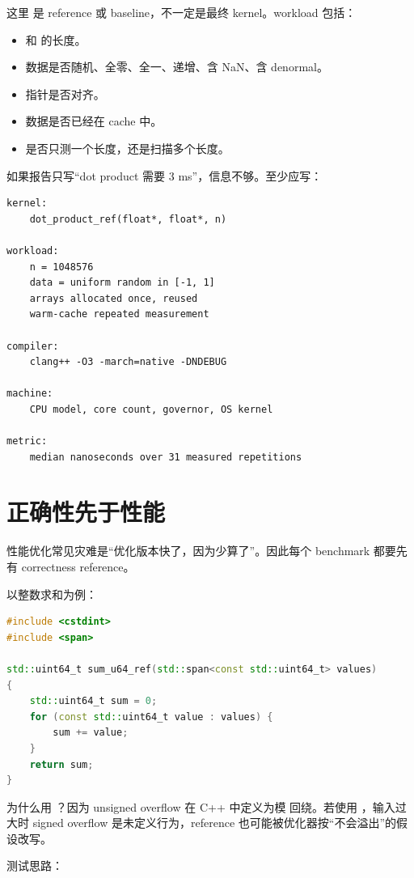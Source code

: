 这里  是 reference 或 baseline，不一定是最终 kernel。workload 包括：

\begin{itemize}
  \item {} 和  的长度。
  \item 数据是否随机、全零、全一、递增、含 NaN、含 denormal。
  \item 指针是否对齐。
  \item 数据是否已经在 cache 中。
  \item 是否只测一个长度，还是扫描多个长度。
\end{itemize}

如果报告只写“dot product 需要 3 ms”，信息不够。至少应写：

\begin{lstlisting}
kernel:
    dot_product_ref(float*, float*, n)

workload:
    n = 1048576
    data = uniform random in [-1, 1]
    arrays allocated once, reused
    warm-cache repeated measurement

compiler:
    clang++ -O3 -march=native -DNDEBUG

machine:
    CPU model, core count, governor, OS kernel

metric:
    median nanoseconds over 31 measured repetitions
\end{lstlisting}

\section{正确性先于性能}

性能优化常见灾难是“优化版本快了，因为少算了”。因此每个 benchmark 都要先有 correctness reference。

以整数求和为例：

\begin{lstlisting}[language=C++]
#include <cstdint>
#include <span>

std::uint64_t sum_u64_ref(std::span<const std::uint64_t> values)
{
    std::uint64_t sum = 0;
    for (const std::uint64_t value : values) {
        sum += value;
    }
    return sum;
}
\end{lstlisting}

为什么用 ？因为 unsigned overflow 在 C++ 中定义为模  回绕。若使用 ，输入过大时 signed overflow 是未定义行为，reference 也可能被优化器按“不会溢出”的假设改写。

测试思路：

